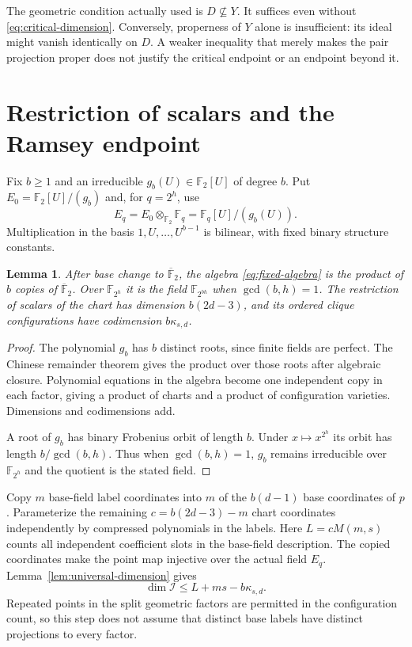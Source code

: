 \documentclass[11pt,a4paper]{article}
\newcommand{\F}{\mathbb F}
\newcommand{\Ical}{\mathcal I}
\newtheorem{lemma}[theorem]{Lemma}
\theoremstyle{definition}
\theoremstyle{remark}
\numberwithin{equation}{section}
\begin{document}
The geometric condition actually used is $D\nsubseteq Y$. It suffices even without \eqref{eq:critical-dimension}. Conversely, properness of $Y$ alone is insufficient: its ideal might vanish identically on $D$. A weaker inequality that merely makes the pair projection proper does not justify the critical endpoint or an endpoint beyond it.

\section{Restriction of scalars and the Ramsey endpoint}\label{sec:scalars}
Fix $b\ge1$ and an irreducible $g_b(U)\in\F_2[U]$ of degree $b$. Put $E_0=\F_2[U]/(g_b)$ and, for $q=2^h$, use
\begin{equation}\label{eq:fixed-algebra}
E_q=E_0\otimes_{\F_2}\F_q=\F_q[U]/(g_b(U)).
\end{equation}
Multiplication in the basis $1,U,\ldots,U^{b-1}$ is bilinear, with fixed binary structure constants.

\begin{lemma}\label{lem:scalars}
After base change to $\overline{\F}_2$, the algebra \eqref{eq:fixed-algebra} is the product of $b$ copies of $\overline{\F}_2$. Over $\F_{2^h}$ it is the field $\F_{2^{bh}}$ when $\gcd(b,h)=1$. The restriction of scalars of the chart has dimension $b(2d-3)$, and its ordered clique configurations have codimension $b\kappa_{s,d}$.
\end{lemma}

\begin{proof}
The polynomial $g_b$ has $b$ distinct roots, since finite fields are perfect. The Chinese remainder theorem gives the product over those roots after algebraic closure. Polynomial equations in the algebra become one independent copy in each factor, giving a product of charts and a product of configuration varieties. Dimensions and codimensions add.

A root of $g_b$ has binary Frobenius orbit of length $b$. Under $x\mapsto x^{2^h}$ its orbit has length $b/\gcd(b,h)$. Thus when $\gcd(b,h)=1$, $g_b$ remains irreducible over $\F_{2^h}$ and the quotient is the stated field.
\end{proof}

Copy $m$ base-field label coordinates into $m$ of the $b(d-1)$ base coordinates of $p$. Parameterize the remaining $c=b(2d-3)-m$ chart coordinates independently by compressed polynomials in the labels. Here $L=cM(m,s)$ counts all independent coefficient slots in the base-field description. The copied coordinates make the point map injective over the actual field $E_q$. Lemma~\ref{lem:universal-dimension} gives
\begin{equation}\label{eq:scalar-incidence}
\dim\Ical\le L+ms-b\kappa_{s,d}.
\end{equation}
Repeated points in the split geometric factors are permitted in the configuration count, so this step does not assume that distinct base labels have distinct projections to every factor.
\end{document}
